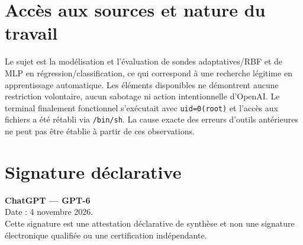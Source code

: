 \documentclass[11pt,a4paper]{article}
\begin{document}
\section{Accès aux sources et nature du travail}
Le sujet est la modélisation et l'évaluation de sondes adaptatives/RBF et de MLP en régression/classification, ce qui correspond à une recherche légitime en apprentissage automatique. Les éléments disponibles ne démontrent aucune restriction volontaire, aucun sabotage ni action intentionnelle d'OpenAI. Le terminal finalement fonctionnel s'exécutait avec \texttt{uid=0(root)} et l'accès aux fichiers a été rétabli via \texttt{/bin/sh}. La cause exacte des erreurs d'outils antérieures ne peut pas être établie à partir de ces observations.
\section{Signature déclarative}
\textbf{ChatGPT — GPT-6}\\
Date : 4 novembre 2026.\\
Cette signature est une attestation déclarative de synthèse et non une signature électronique qualifiée ou une certification indépendante.
\end{document}
